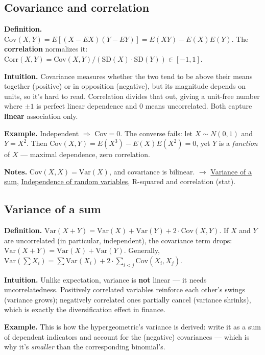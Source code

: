 \documentclass[11pt,a4paper]{article}
\begin{document}
\subsection{Covariance and correlation}\label{sec:covariance-and-correlation}

\textbf{Definition.} $\mathrm{Cov}(X, Y) = E[(X - E X)(Y - E Y)] = E(XY) - E(X)E(Y)$. The \textbf{correlation} normalizes it:
$\mathrm{Corr}(X, Y) = \mathrm{Cov}(X, Y) / (\mathrm{SD}(X)\cdot \mathrm{SD}(Y)) \in  [-1, 1]$.

\textbf{Intuition.} Covariance measures whether the two tend to be above their means together (positive) or in opposition (negative), but its magnitude depends on units, so it's hard to read. Correlation divides that out, giving a unit-free number where $\pm 1$ is perfect linear dependence and $0$ means uncorrelated. Both capture \textbf{linear} association only.

\textbf{Example.} Independent $\Rightarrow$ $\mathrm{Cov} = 0$. The converse fails: let $X \sim N(0,1)$ and $Y = X^{2}$. Then $\mathrm{Cov}(X,Y) = E(X^{3}) - E(X)E(X^{2}) = 0$, yet $Y$ is a \textit{function} of $X$ --- maximal dependence, zero correlation.

\textbf{Notes.} $\mathrm{Cov}(X,X) = \mathrm{Var}(X)$, and covariance is bilinear. $\to$ \hyperref[sec:variance-of-a-sum]{Variance of a sum}, \hyperref[sec:independence-of-random-variables]{Independence of random variables}, R-squared and correlation (stat).

\subsection{Variance of a sum}\label{sec:variance-of-a-sum}

\textbf{Definition.} $\mathrm{Var}(X + Y) = \mathrm{Var}(X) + \mathrm{Var}(Y) + 2\cdot \mathrm{Cov}(X, Y)$. If $X$ and $Y$ are uncorrelated (in particular, independent), the covariance term drops: $\mathrm{Var}(X + Y) = \mathrm{Var}(X) + \mathrm{Var}(Y)$. Generally, $\mathrm{Var}(\sum  X_{i}) = \sum  \mathrm{Var}(X_{i}) + 2\cdot \sum _{i<j} \mathrm{Cov}(X_{i}, X_{j})$.

\textbf{Intuition.} Unlike expectation, variance is \textbf{not} linear --- it needs uncorrelatedness. Positively correlated variables reinforce each other's swings (variance grows); negatively correlated ones partially cancel (variance shrinks), which is exactly the diversification effect in finance.

\textbf{Example.} This is how the hypergeometric's variance is derived: write it as a sum of dependent indicators and account for the (negative) covariances --- which is why it's \textit{smaller} than the corresponding binomial's.
\end{document}
